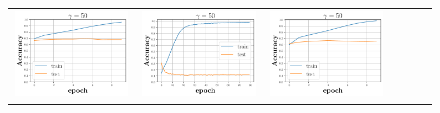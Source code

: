 \begin{figure}[h]
\begin{minipage}{0.99\columnwidth}
{\begin{tabular}{cccccc}
\includegraphics[scale=0.125]{figs/galu_50_good.pdf}&
\includegraphics[scale=0.125]{figs/galu_50_bad.pdf}&
\includegraphics[scale=0.125]{figs/galu_50_bad_good.pdf}&

\end{tabular}}
\end{minipage}
\end{figure}
